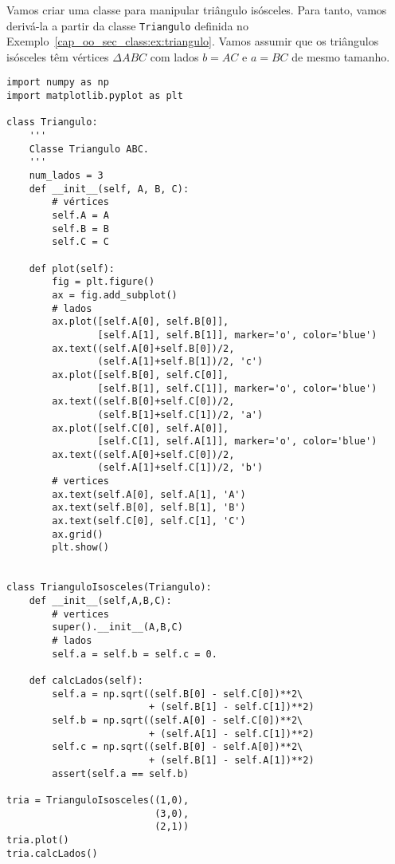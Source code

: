 \begin{ex}
  Vamos criar uma classe para manipular triângulo isósceles. Para tanto, vamos derivá-la a partir da classe \lstinline+Triangulo+ definida no Exemplo~\ref{cap_oo_sec_class:ex:triangulo}. Vamos assumir que os triângulos isósceles têm vértices $\Delta ABC$ com lados $b = AC$ e $a = BC$ de mesmo tamanho.
\begin{lstlisting}[caption=classTrianguloIsosceles.py, label=cap_oo_sec_her:cod:classTrianguloIsosceles]
import numpy as np
import matplotlib.pyplot as plt

class Triangulo:
    '''
    Classe Triangulo ABC.
    '''
    num_lados = 3
    def __init__(self, A, B, C):
        # vértices
        self.A = A
        self.B = B
        self.C = C

    def plot(self):
        fig = plt.figure()
        ax = fig.add_subplot()
        # lados
        ax.plot([self.A[0], self.B[0]],
                [self.A[1], self.B[1]], marker='o', color='blue')
        ax.text((self.A[0]+self.B[0])/2,
                (self.A[1]+self.B[1])/2, 'c')
        ax.plot([self.B[0], self.C[0]],
                [self.B[1], self.C[1]], marker='o', color='blue')
        ax.text((self.B[0]+self.C[0])/2,
                (self.B[1]+self.C[1])/2, 'a')
        ax.plot([self.C[0], self.A[0]],
                [self.C[1], self.A[1]], marker='o', color='blue')
        ax.text((self.A[0]+self.C[0])/2,
                (self.A[1]+self.C[1])/2, 'b')
        # vertices
        ax.text(self.A[0], self.A[1], 'A')
        ax.text(self.B[0], self.B[1], 'B')
        ax.text(self.C[0], self.C[1], 'C')
        ax.grid()
        plt.show()


class TrianguloIsosceles(Triangulo):
    def __init__(self,A,B,C):
        # vertices
        super().__init__(A,B,C)
        # lados
        self.a = self.b = self.c = 0.

    def calcLados(self):
        self.a = np.sqrt((self.B[0] - self.C[0])**2\
                         + (self.B[1] - self.C[1])**2)
        self.b = np.sqrt((self.A[0] - self.C[0])**2\
                         + (self.A[1] - self.C[1])**2)
        self.c = np.sqrt((self.B[0] - self.A[0])**2\
                         + (self.B[1] - self.A[1])**2)
        assert(self.a == self.b)

tria = TrianguloIsosceles((1,0),
                          (3,0),
                          (2,1))
tria.plot()
tria.calcLados()
\end{lstlisting}
\end{ex}


